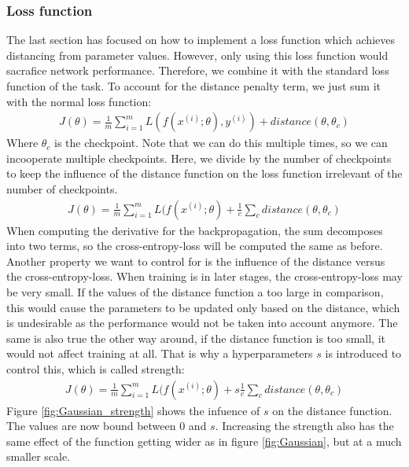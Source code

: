 \subsubsection{Loss function}\label{sub:Loss_function}
The last section has focused on how to implement a loss function which achieves
distancing from parameter values. However, only using this loss function would
sacrafice network performance. Therefore, we combine it with the standard loss
function of the task. To account for the distance penalty term, we just sum it with the normal loss function:
\begin{align}\label{eq:Loss_distance}
    J(\theta)=\frac{1}{m} \sum_{i=1}^m L(f(x^{(i)}; \theta), y^{(i)}) + distance(\theta, \theta_c)
\end{align}
Where $\theta_c$ is the checkpoint. Note that we can do this multiple times, so
we can incooperate multiple checkpoints. Here, we divide by the number of
checkpoints to keep the influence of the distance function on the loss function
irrelevant of the number of checkpoints.
\begin{align}
    J(\theta)=\frac{1}{m} \sum_{i=1}^m L(f(x^{(i)}; \theta) + \frac{1}{c} \sum_c distance(\theta, \theta_c)
\end{align}
When computing the derivative for the backpropagation, the sum
decomposes into two terms, so the cross-entropy-loss will be computed the same
as before. Another property we want to control for is the influence of the
distance versus the cross-entropy-loss. When training is in later stages, the
cross-entropy-loss may be very small. If the values of the distance function a
too large in comparison, this would cause the parameters to be updated only
based on the distance, which is undesirable as the performance would not be taken
into account anymore. The same is also true the other way around, if the
distance function is too small, it would not affect training at all. That is why
a hyperparameters $s$ is introduced to control this, which is called strength:
\begin{align}\label{eq:Loss_strength}
    J(\theta)=\frac{1}{m} \sum_{i=1}^m L(f(x^{(i)}; \theta) + s \frac{1}{c} \sum_c distance(\theta, \theta_c)
\end{align}
Figure \ref{fig:Gaussian_strength} shows the infuence of $s$ on the distance
function. The values are now bound between 0 and $s$. Increasing the strength
also has the same effect of the function getting wider as in figure
\ref{fig:Gaussian}, but at a much smaller scale. 

